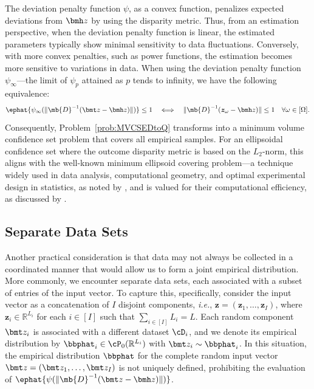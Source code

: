\documentclass[mnsc, nonblindrev]{informswp}
\newcommand{\1}[1]{\mathds{1}{\left(#1\right)}}
\begin{document}
The deviation penalty function $\psi$, as a convex function, penalizes expected deviations from $\bmh z$ by using the disparity metric. Thus, from an estimation perspective, when the deviation penalty function is linear, the estimated parameters typically show minimal sensitivity to data fluctuations. Conversely, with more convex penalties, such as power functions, the estimation becomes more sensitive to variations in data. When using the deviation penalty function $\psi_\infty$---the limit of $\psi_p$ attained as $p$ tends to infinity, we have the following equivalence:
$$
\ephat{\psi_\infty(\|\mb{D}^{-1}( \bmt z - \bmh z )\|)} \leq 1
~~~\Longleftrightarrow~~~
\|\mb{D}^{-1}( \bm z_{\omega} - \bmh z )\| \leq 1 ~~~\forall \omega \in [\Omega]. 
$$
Consequently, Problem~\eqref{prob:MVCSEDtoQ} transforms into a minimum volume confidence set problem that covers all empirical samples. For an ellipsoidal confidence set where the outcome disparity metric is based on the $L_2$-norm, this aligns with the well-known minimum ellipsoid covering problem---a technique widely used in data analysis, computational geometry, and optimal experimental design in statistics, as noted by \cite{todd2016minimum}, and is valued for their computational efficiency, as discussed by \cite{sun2004computation}.

\subsection{Separate Data Sets}
Another practical consideration is that data may not always be collected in a coordinated manner that would allow us to form a joint empirical distribution. More commonly, we encounter separate data sets, each associated with a subset of entries of the input vector. To capture this, specifically, consider the input vector as a concatenation of $I$ disjoint components, \textit{i.e.}, $\bm z = (\bm z_1, \dots, \bm z_I)$, where $\bm z_i \in \mathbb{R}^{L_i}$ for each $i \in [I]$ such that $\sum_{i \in [I]}L_i = L$. Each random component $\bmt z_i$ is associated with a different dataset $\cD_i$, and we denote its empirical distribution by $\bbphat_i \in \cP_0(\mathbb{R}^{L_i})$ with $\bmt z_i \sim \bbphat_i$. In this situation, the empirical distribution $\bbphat$ for the complete random input vector $\bmt z = (\bmt z_1, \dots, \bmt z_I)$ is not uniquely defined, prohibiting the evaluation of $\ephat{\psi(\|\mb{D}^{-1}(\bmt z - \bmh z)\|)}$.
\end{document}
